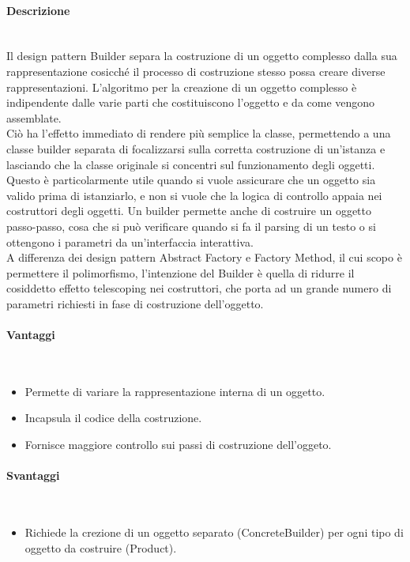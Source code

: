 \paragraph{Descrizione} \mbox{} \\
Il design pattern Builder separa la costruzione di un oggetto complesso dalla sua rappresentazione cosicché il processo di costruzione stesso possa creare diverse rappresentazioni. L'algoritmo per la creazione di un oggetto complesso è indipendente dalle varie parti che costituiscono l'oggetto e da come vengono assemblate. \\
Ciò ha l'effetto immediato di rendere più semplice la classe, permettendo a una classe builder separata di focalizzarsi sulla corretta costruzione di un'istanza e lasciando che la classe originale si concentri sul funzionamento degli oggetti. Questo è particolarmente utile quando si vuole assicurare che un oggetto sia valido prima di istanziarlo, e non si vuole che la logica di controllo appaia nei costruttori degli oggetti. Un builder permette anche di costruire un oggetto passo-passo, cosa che si può verificare quando si fa il parsing di un testo o si ottengono i parametri da un'interfaccia interattiva. \\
A differenza dei design pattern Abstract Factory e Factory Method, il cui scopo è permettere il polimorfismo, l'intenzione del Builder è quella di ridurre il cosiddetto effetto telescoping nei costruttori, che porta ad un grande numero di parametri richiesti in fase di costruzione dell'oggetto.
\paragraph{Vantaggi} \mbox{} \\
\begin{itemize}
\item Permette di variare la rappresentazione interna di un oggetto.
\item Incapsula il codice della costruzione.
\item Fornisce maggiore controllo sui passi di costruzione dell'oggeto.
\end{itemize}
\paragraph{Svantaggi} \mbox{} \\
\begin{itemize}
\item Richiede la crezione di un oggetto separato (ConcreteBuilder) per ogni tipo di oggetto da costruire (Product).
\end{itemize}
